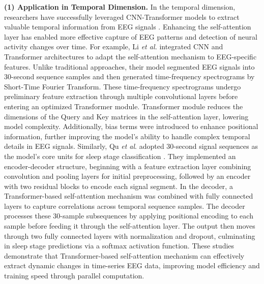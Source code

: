 \documentclass[preprint,12pt]{elsarticle}
\newcommand{\etal}{\textit{et al}. }
\begin{document}
\textbf{(1) Application in Temporal Dimension.}
In the temporal dimension, researchers have successfully leveraged CNN-Transformer models to extract valuable temporal information from EEG signals \cite{xie2022transformer}. Enhancing the self-attention layer has enabled more effective capture of EEG patterns and detection of neural activity changes over time. For example, Li \textit{et al.} \cite{li2022eeg} integrated CNN and Transformer architectures to adapt the self-attention mechanism to EEG-specific features. Unlike traditional approaches, their model segmented EEG signals into 30-second sequence samples and then generated time-frequency spectrograms by Short-Time Fourier Transform. These time-frequency spectrograms undergo preliminary feature extraction through multiple convolutional layers before entering an optimized Transformer module. Transformer module reduces the dimensions of the Query and Key matrices in the self-attention layer, lowering model complexity. Additionally, bias terms \cite{liu2021swin} were introduced to enhance positional information, further improving the model's ability to handle complex temporal details in EEG signals. Similarly, Qu \etal adopted 30-second signal sequences as the model's core units for sleep stage classification \cite{qu2020residual}. They implemented an encoder-decoder structure, beginning with a feature extraction layer combining convolution and pooling layers for initial preprocessing, followed by an encoder with two residual blocks to encode each signal segment. In the decoder, a Transformer-based self-attention mechanism was combined with fully connected layers to capture correlations across temporal sequence samples. The decoder processes these 30-sample subsequences by applying positional encoding to each sample before feeding it through the self-attention layer. The output then moves through two fully connected layers with normalization and dropout, culminating in sleep stage predictions via a softmax activation function. These studies demonstrate that Transformer-based self-attention mechanism can effectively extract dynamic changes in time-series EEG data, improving model efficiency and training speed through parallel computation.
\end{document}
